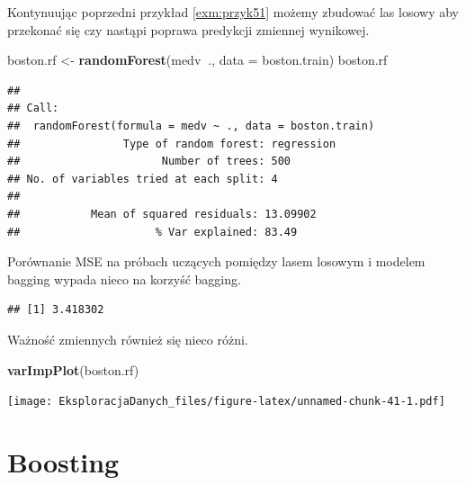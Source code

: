 \documentclass[]{book}
\newenvironment{Shaded}{\begin{snugshade}}{\end{snugshade}}
\newcommand{\DataTypeTok}[1]{\textcolor[rgb]{0.13,0.29,0.53}{#1}}
\newcommand{\KeywordTok}[1]{\textcolor[rgb]{0.13,0.29,0.53}{\textbf{#1}}}
\newcommand{\NormalTok}[1]{#1}
\newcommand{\OperatorTok}[1]{\textcolor[rgb]{0.81,0.36,0.00}{\textbf{#1}}}
\newcommand{\StringTok}[1]{\textcolor[rgb]{0.31,0.60,0.02}{#1}}
\theoremstyle{plain}
\theoremstyle{definition}
\theoremstyle{definition}
\theoremstyle{definition}
\theoremstyle{definition}
\theoremstyle{remark}
\let\BeginKnitrBlock\begin \let\EndKnitrBlock\end
\begin{document}
\BeginKnitrBlock{example}
\protect\hypertarget{exm:przyk52}{}{\label{exm:przyk52} }Kontynuując poprzedni przykład \ref{exm:przyk51} możemy zbudować las losowy aby przekonać się czy nastąpi poprawa predykcji zmiennej wynikowej.
\EndKnitrBlock{example}

\begin{Shaded}
\begin{Highlighting}[]
\NormalTok{boston.rf <-}\StringTok{ }\KeywordTok{randomForest}\NormalTok{(medv}\OperatorTok{~}\NormalTok{., }\DataTypeTok{data =}\NormalTok{ boston.train)}
\NormalTok{boston.rf}
\end{Highlighting}
\end{Shaded}

\begin{verbatim}
## 
## Call:
##  randomForest(formula = medv ~ ., data = boston.train) 
##                Type of random forest: regression
##                      Number of trees: 500
## No. of variables tried at each split: 4
## 
##           Mean of squared residuals: 13.09902
##                     % Var explained: 83.49
\end{verbatim}

Porównanie MSE na próbach uczących pomiędzy lasem losowym i modelem bagging wypada nieco na korzyść bagging.

\begin{Shaded}
\end{Shaded}

\begin{verbatim}
## [1] 3.418302
\end{verbatim}

Ważność zmiennych również się nieco różni.

\begin{Shaded}
\begin{Highlighting}[]
\KeywordTok{varImpPlot}\NormalTok{(boston.rf)}
\end{Highlighting}
\end{Shaded}

\texttt{[image: EksploracjaDanych\_files/figure-latex/unnamed-chunk-41-1.pdf]}

\hypertarget{boosting}{%
\section{Boosting}\label{boosting}}
\end{document}
